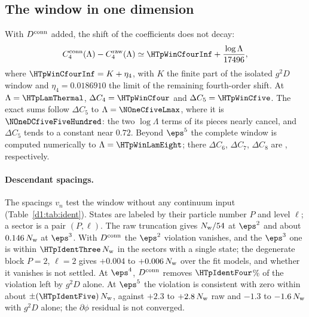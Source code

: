 \subsection{The window in one dimension}\label{d1:sec:window}
With $D^{\rm conn}$ added, the shift of the coefficients does not decay:
\begin{equation}
 C_4^{\rm conn}(\Lambda)-C_4^{\rm raw}(\Lambda)\simeq\HTpWinCfourInf+\frac{\log\Lambda}{17496},
 \label{eq:dC4}
\end{equation}
where $\HTpWinCfourInf=K+\eta_4$, with $K$ the finite part of the isolated $g^2D$ window and $\eta_4=0.0186910$ the
limit of the remaining fourth-order shift. At $\Lambda=\HTpLamThermal$, $\Delta C_4=\HTpWinCfour$ and $\Delta
C_5=\HTpWinCfive$. The exact sums follow $\Delta C_5$ to $\Lambda=\NOneCfiveLmax$, where it is $\NOneDCfiveFiveHundred$:
the two $\log\Lambda$ terms of its pieces nearly cancel, and $\Delta C_5$ tends to a constant near $0.72$. Beyond
$\eps^5$ the complete window is computed numerically to $\Lambda=\HTpWinLamEight$; there $\Delta C_6$, $\Delta C_7$,
$\Delta C_8$ are \NOneDCSeventyTwo, respectively.

\paragraph{Descendant spacings.} The spacings $v_n$ test the window without any continuum input
(Table~\ref{d1:tab:ident}). States are labeled by their particle number $P$ and level $\ell$; a sector is a pair
$(P,\ell)$. The raw truncation gives $N_{\rm w}/54$ at $\eps^2$ and about $0.146\,N_{\rm w}$ at $\eps^3$. With
$D^{\rm conn}$ the $\eps^2$ violation vanishes, and the $\eps^3$ one is within $\HTpIdentThree\,N_{\rm w}$ in the
sectors with a single state; the degenerate block $P=2$, $\ell=2$ gives $+0.004$ to $+0.006\,N_{\rm w}$ over the fit
models, and whether it vanishes is not settled. At $\eps^4$, $D^{\rm conn}$ removes $\HTpIdentFour$\% of the violation
left by $g^2D$ alone. At $\eps^5$ the violation is consistent with zero within about $\pm(\HTpIdentFive)\,N_{\rm w}$,
against $+2.3$ to $+2.8\,N_{\rm w}$ raw and $-1.3$ to $-1.6\,N_{\rm w}$ with $g^2D$ alone; the $\partial\phi$ residual is
not converged.

